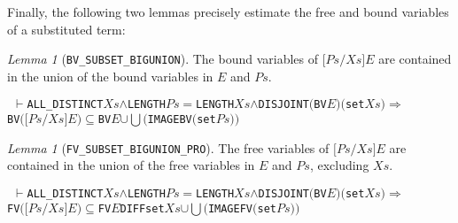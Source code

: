 \documentclass[GCNS]{yincog}
\renewcommand{\HOLinline}[1]{\mbox{\textup{\texttt{#1}}}}
\renewcommand{\HOLConst}[1]{\texttt{#1}}
\renewcommand{\HOLFreeVar}[1]{\ensuremath{\mathit{#1}}}
\renewcommand{\HOLSymConst}[1]{#1}
\renewcommand{\HOLTokenConj}{\ensuremath{\wedge}}
\renewcommand{\HOLTokenSubset}{\ensuremath{\subseteq}}
\renewcommand{\HOLTokenUnion}{\ensuremath{\cup}}
\renewcommand{\HOLTokenTurnstile}{\ensuremath{\:\:\vdash}}
\renewcommand{\HOLTokenBigUnion}{\ensuremath{\bigcup}}
\theoremstyle{remark}
\theoremstyle{theorem}
\newtheorem{lemma}[definition]{Lemma}
\theoremstyle{remark}
\renewcommand{\HOLTokenImp}{\ensuremath{\Longrightarrow}}
\begin{document}
Finally, the following two lemmas precisely estimate the free and bound
variables of a substituted term:
%
\begin{lemma}[\texttt{BV\_SUBSET\_BIGUNION}]
The bound variables of
\HOLinline{\ensuremath{[}\HOLFreeVar{Ps}\ensuremath{/}\HOLFreeVar{Xs}\ensuremath{]}\\\;\HOLFreeVar{E}}
are contained in the union of the bound variables in $E$ and
\HOLinline{\HOLFreeVar{Ps}}.
%
\begin{alltt}
\HOLTokenTurnstile{} \HOLConst{ALL\_DISTINCT} \HOLFreeVar{Xs} \HOLSymConst{\HOLTokenConj{}} \HOLConst{LENGTH} \HOLFreeVar{Ps} \HOLSymConst{\ensuremath{=}} \HOLConst{LENGTH} \HOLFreeVar{Xs} \HOLSymConst{\HOLTokenConj{}} \HOLConst{DISJOINT} \ensuremath{(}\HOLConst{BV} \HOLFreeVar{E}\ensuremath{)} \ensuremath{(}\HOLConst{set} \HOLFreeVar{Xs}\ensuremath{)} \HOLSymConst{\HOLTokenImp{}}
   \HOLConst{BV} \ensuremath{(}\ensuremath{[}\HOLFreeVar{Ps}\ensuremath{/}\HOLFreeVar{Xs}\ensuremath{]} \HOLFreeVar{E}\ensuremath{)} \HOLSymConst{\HOLTokenSubset{}} \HOLConst{BV} \HOLFreeVar{E} \HOLSymConst{\HOLTokenUnion{}} \HOLConst{\HOLTokenBigUnion{}} \ensuremath{(}\HOLConst{IMAGE} \HOLConst{BV} \ensuremath{(}\HOLConst{set} \HOLFreeVar{Ps}\ensuremath{)}\ensuremath{)}
\end{alltt}
%
\end{lemma}

\begin{lemma}[\texttt{FV\_SUBSET\_BIGUNION\_PRO}]
The free variables of
\HOLinline{\ensuremath{[}\HOLFreeVar{Ps}\ensuremath{/}\HOLFreeVar{Xs}\ensuremath{]}\\\;\HOLFreeVar{E}}
are contained in the union of the free variables in $E$ and
\HOLinline{\HOLFreeVar{Ps}}, excluding \HOLinline{\HOLFreeVar{Xs}}.
%
\begin{alltt}
\HOLTokenTurnstile{} \HOLConst{ALL\_DISTINCT} \HOLFreeVar{Xs} \HOLSymConst{\HOLTokenConj{}} \HOLConst{LENGTH} \HOLFreeVar{Ps} \HOLSymConst{\ensuremath{=}} \HOLConst{LENGTH} \HOLFreeVar{Xs} \HOLSymConst{\HOLTokenConj{}} \HOLConst{DISJOINT} \ensuremath{(}\HOLConst{BV} \HOLFreeVar{E}\ensuremath{)} \ensuremath{(}\HOLConst{set} \HOLFreeVar{Xs}\ensuremath{)} \HOLSymConst{\HOLTokenImp{}}
   \HOLConst{FV} \ensuremath{(}\ensuremath{[}\HOLFreeVar{Ps}\ensuremath{/}\HOLFreeVar{Xs}\ensuremath{]} \HOLFreeVar{E}\ensuremath{)} \HOLSymConst{\HOLTokenSubset{}} \HOLConst{FV} \HOLFreeVar{E} \HOLConst{DIFF} \HOLConst{set} \HOLFreeVar{Xs} \HOLSymConst{\HOLTokenUnion{}} \HOLConst{\HOLTokenBigUnion{}} \ensuremath{(}\HOLConst{IMAGE} \HOLConst{FV} \ensuremath{(}\HOLConst{set} \HOLFreeVar{Ps}\ensuremath{)}\ensuremath{)}
\end{alltt}
%
\end{lemma}
\end{document}

